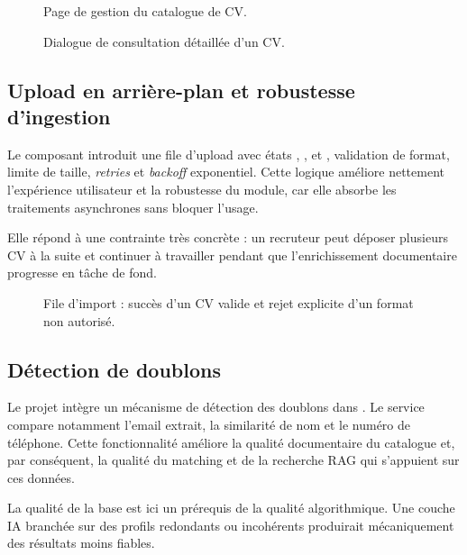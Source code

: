 \begin{figure}[H]
  \centering
  \caption{\label{fig:cv-pool-page}Page de gestion du catalogue de CV.}
\end{figure}

\begin{figure}[H]
  \centering
  \caption{\label{fig:cv-pool-details}Dialogue de consultation détaillée d'un CV.}
\end{figure}

\subsection{Upload en arrière-plan et robustesse d'ingestion}
Le composant  introduit une file d'upload avec états , ,  et , validation de format, limite de taille, \textit{retries} et \textit{backoff} exponentiel. Cette logique améliore nettement l'expérience utilisateur et la robustesse du module, car elle absorbe les traitements asynchrones sans bloquer l'usage.

Elle répond à une contrainte très concrète : un recruteur peut déposer plusieurs CV à la suite et continuer à travailler pendant que l'enrichissement documentaire progresse en tâche de fond.
\begin{figure}[H]
  \centering
  \caption{\label{fig:cv-upload-states}File d'import : succès d'un CV valide et rejet explicite d'un format non autorisé.}
\end{figure}

\subsection{Détection de doublons}
Le projet intègre un mécanisme de détection des doublons dans . Le service compare notamment l'email extrait, la similarité de nom et le numéro de téléphone. Cette fonctionnalité améliore la qualité documentaire du catalogue et, par conséquent, la qualité du matching et de la recherche RAG qui s'appuient sur ces données.

La qualité de la base est ici un prérequis de la qualité algorithmique. Une couche IA branchée sur des profils redondants ou incohérents produirait mécaniquement des résultats moins fiables.

